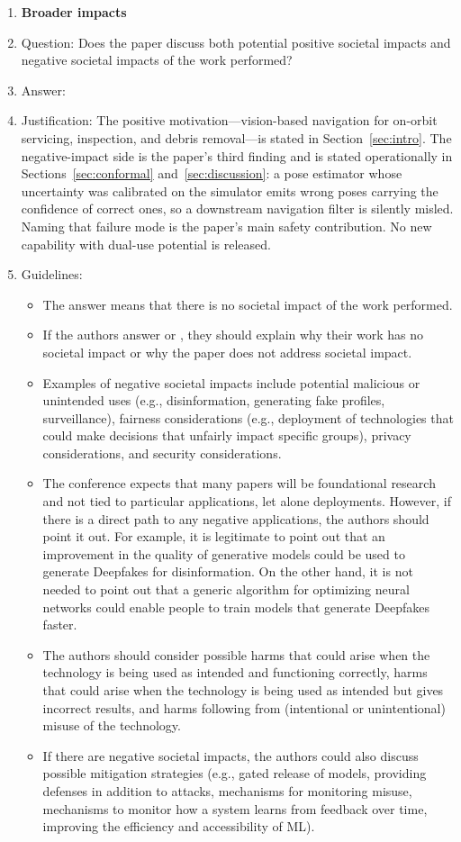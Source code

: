 \begin{enumerate}
\item {\bf Broader impacts}
    \item[] Question: Does the paper discuss both potential positive societal impacts and negative societal impacts of the work performed?
    \item[] Answer: \answerYes{}
    \item[] Justification: The positive motivation---vision-based navigation for on-orbit servicing, inspection, and
    debris removal---is stated in Section~\ref{sec:intro}. The negative-impact side is the
    paper's third finding and is stated operationally in Sections~\ref{sec:conformal}
    and~\ref{sec:discussion}: a pose estimator whose uncertainty was calibrated on the
    simulator emits wrong poses carrying the confidence of correct ones, so a downstream
    navigation filter is silently misled. Naming that failure mode is the paper's main safety
    contribution. No new capability with dual-use potential is released.
    \item[] Guidelines:
    \begin{itemize}
        \item The answer \answerNA{} means that there is no societal impact of the work performed.
        \item If the authors answer \answerNA{} or \answerNo, they should explain why their work has no societal impact or why the paper does not address societal impact.
        \item Examples of negative societal impacts include potential malicious or unintended uses (e.g., disinformation, generating fake profiles, surveillance), fairness considerations (e.g., deployment of technologies that could make decisions that unfairly impact specific groups), privacy considerations, and security considerations.
        \item The conference expects that many papers will be foundational research and not tied to particular applications, let alone deployments. However, if there is a direct path to any negative applications, the authors should point it out. For example, it is legitimate to point out that an improvement in the quality of generative models could be used to generate Deepfakes for disinformation. On the other hand, it is not needed to point out that a generic algorithm for optimizing neural networks could enable people to train models that generate Deepfakes faster.
        \item The authors should consider possible harms that could arise when the technology is being used as intended and functioning correctly, harms that could arise when the technology is being used as intended but gives incorrect results, and harms following from (intentional or unintentional) misuse of the technology.
        \item If there are negative societal impacts, the authors could also discuss possible mitigation strategies (e.g., gated release of models, providing defenses in addition to attacks, mechanisms for monitoring misuse, mechanisms to monitor how a system learns from feedback over time, improving the efficiency and accessibility of ML).
    \end{itemize}
    

\end{enumerate}
